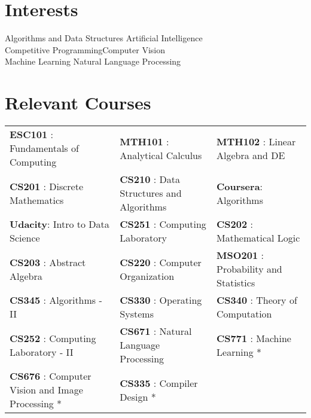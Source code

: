\documentclass[a4paper]{norm-resume}
\begin{document}

\section{Interests}

\vspace{2mm} %

	{\large{
	{Algorithms and Data Structures \hfill Artificial Intelligence \\
	Competitive Programming\hfill Computer Vision\\
	Machine Learning \hfill Natural Language Processing\\}		
	}}

\vspace{2mm}	%


\section{Relevant Courses}

\vspace{2mm} %
		
\begin{small}
	\begin{tabularx}{\textwidth}{X X l}
	{\textbf{ESC101} : Fundamentals of Computing} & {\textbf{MTH101} : Analytical Calculus} &{\textbf{MTH102} : Linear Algebra and DE}\\
	{\textbf{CS201} : Discrete Mathematics}&{\textbf{CS210 }: Data Structures and Algorithms} & {\textbf{Coursera}: Algorithms }\\
	{\textbf{Udacity}: Intro to Data Science } & {\textbf{CS251} : Computing Laboratory} &{\textbf{CS202} : Mathematical Logic} \\ 
	{\textbf{CS203} : Abstract Algebra} & {\textbf{CS220} : Computer Organization} & {\textbf{MSO201} : Probability and Statistics}\\
	{\textbf{CS345} : Algorithms - II}&{\textbf{CS330} : Operating Systems}&{\textbf{CS340} : Theory of Computation}\\
	{\textbf{CS252} : Computing Laboratory - II}&{\textbf{CS671} : Natural Language Processing} &{\textbf{CS771} : Machine Learning *}\\
	{\textbf{CS676} : \footnotesize{Computer Vision and Image Processing *}}&{\textbf{CS335} : Compiler Design *}
	& {\hfill \footnotesize\emphasize{* - Next Semester}}\\
	\end{tabularx}
\end{small}	
\end{document}
